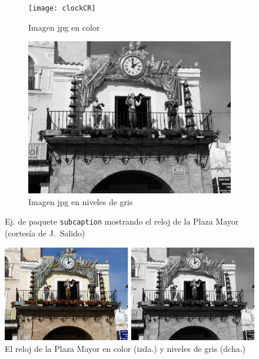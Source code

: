 \documentclass[11pt,a4paper]{article}
\begin{document}
\begin{figure}[hbt]
	\centering
	\begin{subfigure}[b]{0.4\linewidth}
		\centering
		\texttt{[image: clockCR]}
		\caption{Imagen jpg en color}\label{fig:clockCR}
	\end{subfigure}
	\begin{subfigure}[b]{0.4\linewidth}
		\centering
		\includegraphics[width=0.8\linewidth]{clockCRbw}
		\caption{Imagen jpg en niveles de gris}\label{fig:clockCRbw}
	\end{subfigure}
	\caption[Comparación jpg color y niveles de gris]{Ej. de paquete \texttt{subcaption} mostrando el reloj de la Plaza Mayor (cortesía de J.~Salido)}
	\label{fig:clock}
\end{figure}



\begin{figure}[hbt]
	\centering
		\includegraphics[width=0.6\linewidth]{2clockCR}
		\caption[Varias imágenes como una]{El reloj de la Plaza Mayor en color (izda.) y niveles de gris (dcha.)}
	\label{fig:2clock}
\end{figure}
\end{document}
